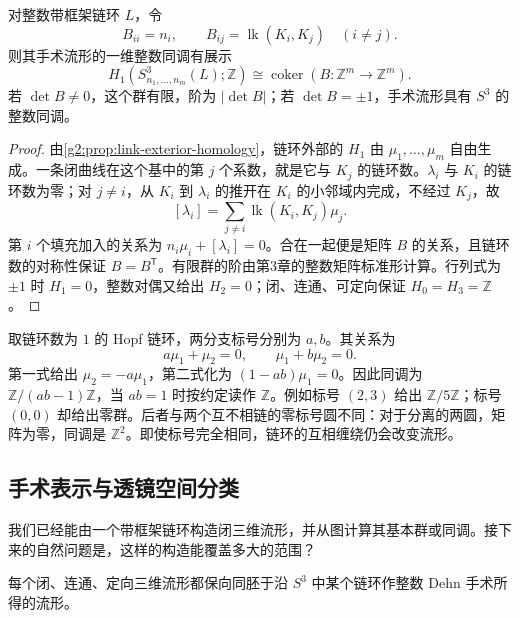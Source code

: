 \begin{proposition}\label{g2:prop:surgery-linking-matrix}
	对整数带框架链环 \(L\)，令
	\[
		B_{ii}=n_i,\qquad B_{ij}=\operatorname{lk}(K_i,K_j)\quad(i\ne j).
	\]
	则其手术流形的一维整数同调有展示
	\[
		H_1(S^3_{n_1,\ldots,n_m}(L);\mathbb Z)\cong\operatorname{coker}(B:\mathbb Z^m\longrightarrow\mathbb Z^m).
	\]
	若 \(\det B\ne0\)，这个群有限，阶为 \(|\det B|\)；若 \(\det B=\pm1\)，手术流形具有 \(S^3\) 的整数同调。
\end{proposition}
\begin{proof}
	由\cref{g2:prop:link-exterior-homology}，链环外部的 \(H_1\) 由 \(\mu_1,\ldots,\mu_m\) 自由生成。一条闭曲线在这个基中的第 \(j\) 个系数，就是它与 \(K_j\) 的链环数。\(\lambda_i\) 与 \(K_i\) 的链环数为零；对 \(j\ne i\)，从 \(K_i\) 到 \(\lambda_i\) 的推开在 \(K_i\) 的小邻域内完成，不经过 \(K_j\)，故
	\[
		[\lambda_i]=\sum_{j\ne i}\operatorname{lk}(K_i,K_j)\mu_j.
	\]
	第 \(i\) 个填充加入的关系为 \(n_i\mu_i+[\lambda_i]=0\)。合在一起便是矩阵 \(B\) 的关系，且链环数的对称性保证 \(B=B^{\mathsf T}\)。有限群的阶由第3章的整数矩阵标准形计算。行列式为 \(\pm1\) 时 \(H_1=0\)，整数对偶又给出 \(H_2=0\)；闭、连通、可定向保证 \(H_0=H_3=\mathbb Z\)。
\end{proof}

\begin{example}\label{g2:exm:hopf-surgery-homology}
	取链环数为 \(1\) 的 Hopf 链环，两分支标号分别为 \(a,b\)。其关系为
	\[
		a\mu_1+\mu_2=0,\qquad \mu_1+b\mu_2=0.
	\]
	第一式给出 \(\mu_2=-a\mu_1\)，第二式化为 \((1-ab)\mu_1=0\)。因此同调为 \(\mathbb Z/(ab-1)\mathbb Z\)，当 \(ab=1\) 时按约定读作 \(\mathbb Z\)。例如标号 \((2,3)\) 给出 \(\mathbb Z/5\mathbb Z\)；标号 \((0,0)\) 却给出零群。后者与两个互不相链的零标号圆不同：对于分离的两圆，矩阵为零，同调是 \(\mathbb Z^2\)。即使标号完全相同，链环的互相缠绕仍会改变流形。
\end{example}

\subsection{手术表示与透镜空间分类}
\label{g2:subsec:A03:03}

我们已经能由一个带框架链环构造闭三维流形，并从图计算其基本群或同调。接下来的自然问题是，这样的构造能覆盖多大的范围？

\begin{theorem}\label{g2:thm:lickorish-wallace}
	每个闭、连通、定向三维流形都保向同胚于沿 \(S^3\) 中某个链环作整数 Dehn 手术所得的流形。
\end{theorem}

